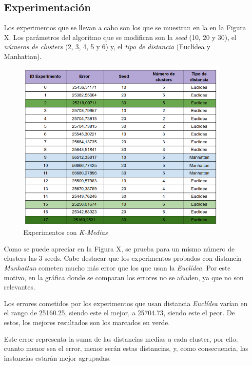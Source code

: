 \documentclass[12pt,a4paper, xcolor=table]{article}
\begin{document}
\subsection{Experimentación}

Los experimentos que se llevan a cabo son los que se muestran en la en la Figura X. Los parámetros del algoritmo que se modifican son la \textit{seed} (10, 20 y 30), el \textit{números de clusters} (2, 3, 4, 5 y 6) y, el \textit{tipo de distancia} (Euclídea y Manhattan).

\begin{figure}[h]
    \centering
    \includegraphics[width=400px]{img/experimentos.png}
    \caption{Experimentos con \textit{K-Medias}}
    \label{fig:graf_exp1}
\end{figure}


Como se puede apreciar en la Figura X, se prueba para un mismo número de clusters las 3 seeds. Cabe destacar que los experimentos probados con distancia \textit{Manhattan} cometen mucho más error que los que usan la \textit{Euclídea}. Por este motivo, en la gráfica donde se comparan los errores no se añaden, ya que no son relevantes.

\vspace{2mm}

Los errores cometidos por los experimentos que usan distancia \textit{Euclídea} varían en el rango de 25160.25, siendo este el mejor, a 25704.73, siendo este el peor. De estos, los mejores resultados son los marcados en verde.

\vspace{2mm}

Este error representa la suma de las distancias medias a cada cluster, por ello, cuanto menor sea el error, menor serán estas distancias, y, como consecuencia, las instancias estarán mejor agrupadas.
\end{document}
